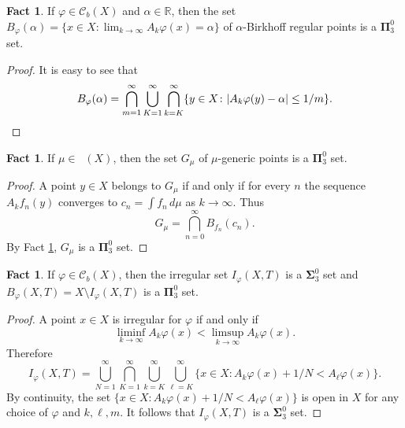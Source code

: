 \documentclass{amsart}
\theoremstyle{definition}
\newtheorem{fact}[thm]{Fact}
\newcommand{\bP}{\boldsymbol{\Pi}}
\newcommand{\bS}{\boldsymbol{\Sigma}}
\renewcommand{\phi}{\varphi}
\DeclareMathOperator{\MT}{\mathcal{M}_{\mathit T} }
\newcommand{\R}{\mathbb{R}}
\newcommand{\N}{\mathbb{N}}
\begin{document}
\begin{fact} \label{upper:Bfi}
If $\phi\in\mathcal{C}_b(X)$ and $\alpha\in\R$, then the set
$B_\phi(\alpha)=\{x\in X:\lim_{k\to\infty}A_k\phi(x)=\alpha\}$ of $\alpha$-Birkhoff regular points is a $\bP^0_3$ set.
\end{fact}
\begin{proof}
It is easy to see that
\[
B_\phi(\alpha)=\bigcap_{m=1}^\infty\bigcup_{K=1}^\infty\bigcap_{k=K}^\infty
\{y\in X\colon | A_k\phi(y)-\alpha|\le 1/m\}. \qedhere
\]
\end{proof}


\begin{fact} \label{upper:Gmu}
If $\mu\in\MT(X)$, then the set $G_\mu$
of $\mu$-generic points is a $\bP^0_3$ set.
\end{fact}


\begin{proof}%
A point $y\in X$ belongs to $G_\mu$ if and only if for every $n$ the sequence
$A_k f_n(y)$ converges to $c_n=\int f_n\,d\mu$ as $k\to\infty$. Thus
\[
G_\mu=\bigcap_{n=0}^\infty B_{f_n}(c_n).
\]
By Fact \ref{upper:Bfi},  $G_\mu$ is a $\bP^0_3$ set.
\end{proof}

\begin{fact} \label{upper:irregular-phi}
If $\phi\in\mathcal{C}_b(X)$, then the irregular set $I_\phi(X,T)$ is a $\bS^0_3$ set
and $B_\phi(X,T)=X\setminus I_\phi(X,T)$ is a $\bP^0_3$ set.
\end{fact}
\begin{proof} A point $x\in X$ is irregular for $\phi$ if and only if %
\[
\liminf_{k\to\infty}A_k\phi(x)<\limsup_{k\to\infty}A_k\phi(x).
\]
Therefore
\[
I_\phi(X,T)=\bigcup_{N=1}^\infty \bigcap_{K=1}^\infty \bigcup_{k= K}^\infty
\bigcup_{\ell= K}^\infty \{x\in X\colon A_k\phi(x)+1/N<A_\ell \phi(x)\}.
\]
By continuity, the set $\{x\in X\colon A_k\phi(x)+1/N<A_\ell \phi(x)\}$ is open in $X$ for any choice of $\phi$ and $k,\ell,m$. It follows that
$I_\phi(X,T)$ is a $\bS^0_3$ set.
\end{proof}
\end{document}
